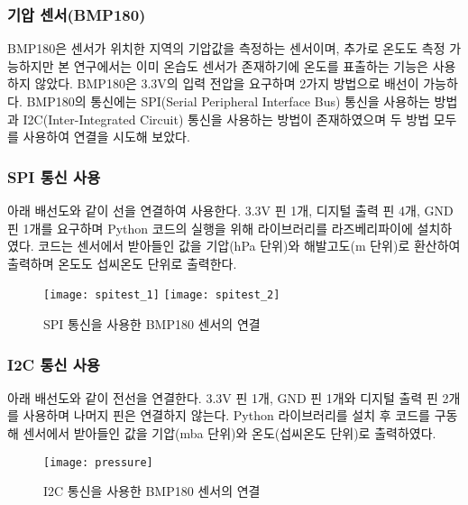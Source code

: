 \subsubsection{기압 센서(BMP180)}
BMP180은 센서가 위치한 지역의 기압값을 측정하는 센서이며, 추가로 온도도 측정 가능하지만 본 연구에서는 이미 온습도 센서가 존재하기에 온도를 표출하는 기능은 사용하지 않았다. BMP180은 3.3V의 입력 전압을 요구하며 2가지 방법으로 배선이 가능하다. BMP180의 통신에는 SPI(Serial Peripheral Interface Bus) 통신을 사용하는 방법과 I2C(Inter-Integrated Circuit) 통신을 사용하는 방법이 존재하였으며 두 방법 모두를 사용하여 연결을 시도해 보았다.
\subsubsection*{SPI 통신 사용}
아래 배선도와 같이 선을 연결하여 사용한다. 3.3V 핀 1개, 디지털 출력 핀 4개, GND 핀 1개를 요구하며 Python 코드의 실행을 위해 라이브러리를 라즈베리파이에 설치하였다. 코드는 센서에서 받아들인 값을 기압(hPa 단위)와 해발고도(m 단위)로 환산하여 출력하며 온도도 섭씨온도 단위로 출력한다.

\begin{figure}[htbp]
	\centering
	\texttt{[image: spitest\_1]}
	\texttt{[image: spitest\_2]}
	\caption{SPI 통신을 사용한 BMP180 센서의 연결}
	\label{SPI}
\end{figure}

\subsubsection*{I2C 통신 사용}
아래 배선도와 같이 전선을 연결한다. 3.3V 핀 1개, GND 핀 1개와 디지털 출력 핀 2개를 사용하며 나머지 핀은 연결하지 않는다. Python 라이브러리를 설치 후 코드를 구동해 센서에서 받아들인 값을 기압(mba 단위)와 온도(섭씨온도 단위)로 출력하였다.

\begin{figure}[htbp]
	\centering
	\texttt{[image: pressure]}
	\caption{I2C 통신을 사용한 BMP180 센서의 연결}
	\label{I2C}
\end{figure}

